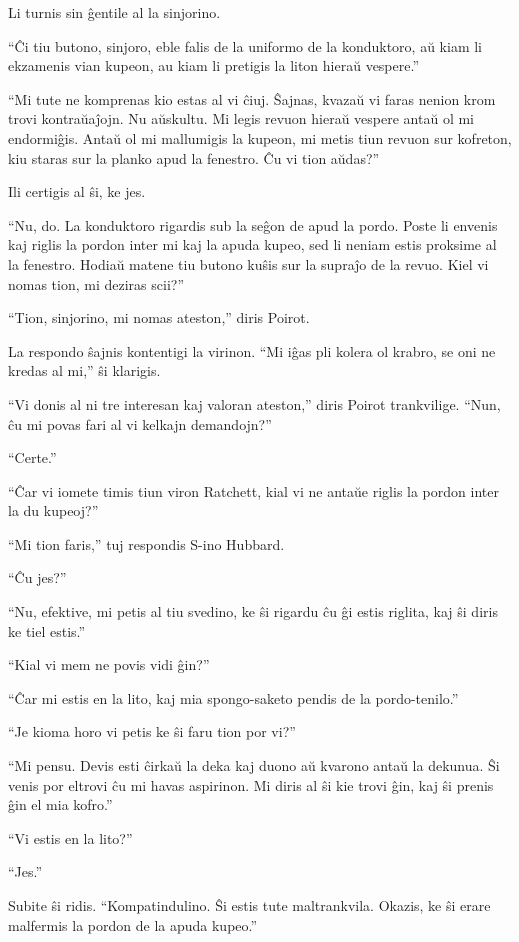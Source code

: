 Li turnis sin ĝentile al la sinjorino.

``Ĉi tiu butono, sinjoro, eble falis de la uniformo de la konduktoro, aŭ kiam li ekzamenis vian kupeon, au kiam li pretigis la liton hieraŭ vespere.''

``Mi tute ne komprenas kio estas al vi ĉiuj. Ŝajnas, kvazaŭ vi faras nenion krom trovi kontraŭaĵojn. Nu aŭskultu. Mi legis revuon hieraŭ vespere antaŭ ol mi endormiĝis. Antaŭ ol mi mallumigis la kupeon, mi metis tiun revuon sur kofreton, kiu staras sur la planko apud la fenestro. Ĉu vi tion aŭdas?''

Ili certigis al ŝi, ke jes.

``Nu, do. La konduktoro rigardis sub la seĝon de apud la pordo. Poste li envenis kaj riglis la pordon inter mi kaj la apuda kupeo, sed li neniam estis proksime al la fenestro. Hodiaŭ matene tiu butono kuŝis sur la supraĵo de la revuo. Kiel vi nomas tion, mi deziras scii?''

``Tion, sinjorino, mi nomas ateston,'' diris Poirot.

La respondo ŝajnis kontentigi la virinon. ``Mi iĝas pli kolera ol krabro, se oni ne kredas al mi,'' ŝi klarigis.

``Vi donis al ni tre interesan kaj valoran ateston,'' diris Poirot trankvilige. ``Nun, ĉu mi povas fari al vi kelkajn demandojn?''

``Certe.''

``Ĉar vi iomete timis tiun viron Ratchett, kial vi ne antaŭe riglis la pordon inter la du kupeoj?''

``Mi tion faris,'' tuj respondis S-ino Hubbard.

``Ĉu jes?''

``Nu, efektive, mi petis al tiu svedino, ke ŝi rigardu ĉu ĝi estis riglita, kaj ŝi diris ke tiel estis.''

``Kial vi mem ne povis vidi ĝin?''

``Ĉar mi estis en la lito, kaj mia spongo-saketo pendis de la pordo-tenilo.''

``Je kioma horo vi petis ke ŝi faru tion por vi?''

``Mi pensu. Devis esti ĉirkaŭ la deka kaj duono aŭ kvarono antaŭ la dekunua. Ŝi venis por eltrovi ĉu mi havas aspirinon. Mi diris al ŝi kie trovi ĝin, kaj ŝi prenis ĝin el mia kofro.''

``Vi estis en la lito?''

``Jes.''

Subite ŝi ridis. ``Kompatindulino. Ŝi estis tute maltrankvila. Okazis, ke ŝi erare malfermis la pordon de la apuda kupeo.''

